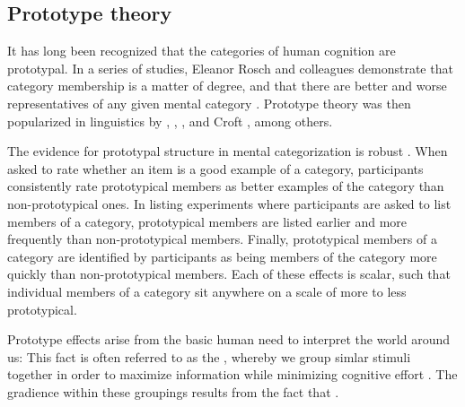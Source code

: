 \subsection{Prototype theory}
\label{sec:2.4.1}

It has long been recognized that the categories of human cognition are prototypal. In a series of studies, Eleanor Rosch and colleagues demonstrate that category membership is a matter of degree, and that there are better and worse representatives of any given mental category \parencites{Rosch1973a}{Rosch1973b}{Rosch1975}{RoschMervis1975}{Roschetal1976}{Rosch1978}. Prototype theory was then popularized in linguistics by \textcite{Lakoff1987}, \textcite{Langacker1987}, \citeauthor{Taylor2003} , and Croft , among others.

The evidence for prototypal structure in mental categorization is robust \parencite[46--47]{Taylor2003}. When asked to rate whether an item is a good example of a category, participants consistently rate prototypical members as better examples of the category than non-prototypical ones. In listing experiments where participants are asked to list members of a category, prototypical members are listed earlier and more frequently than non-prototypical members. Finally, prototypical members of a category are identified by participants as being members of the category more quickly than non-prototypical members. Each of these effects is scalar, such that individual members of a category sit anywhere on a scale of more to less prototypical.

Prototype effects arise from the basic human need to interpret the world around us:  This fact is often referred to as the , whereby we group simlar stimuli together in order to maximize information while minimizing cognitive effort \parencite[255]{EvansGreen2006}. The gradience within these groupings results from the fact that .

